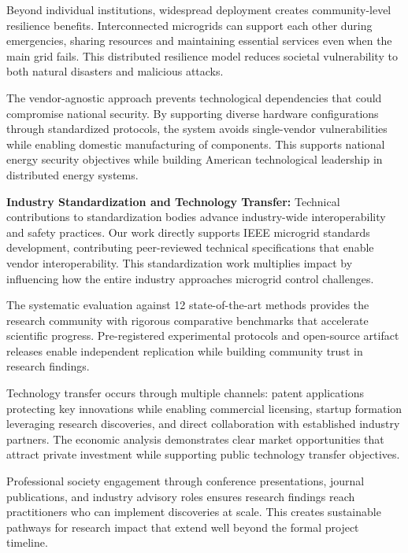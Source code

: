 Beyond individual institutions, widespread deployment creates community-level resilience benefits. Interconnected microgrids can support each other during emergencies, sharing resources and maintaining essential services even when the main grid fails. This distributed resilience model reduces societal vulnerability to both natural disasters and malicious attacks.

The vendor-agnostic approach prevents technological dependencies that could compromise national security. By supporting diverse hardware configurations through standardized protocols, the system avoids single-vendor vulnerabilities while enabling domestic manufacturing of components. This supports national energy security objectives while building American technological leadership in distributed energy systems.

\textbf{Industry Standardization and Technology Transfer:} Technical contributions to standardization bodies advance industry-wide interoperability and safety practices. Our work directly supports IEEE microgrid standards development, contributing peer-reviewed technical specifications that enable vendor interoperability. This standardization work multiplies impact by influencing how the entire industry approaches microgrid control challenges.

The systematic evaluation against 12 state-of-the-art methods \cite{our2024comparative} provides the research community with rigorous comparative benchmarks that accelerate scientific progress. Pre-registered experimental protocols and open-source artifact releases enable independent replication while building community trust in research findings.

Technology transfer occurs through multiple channels: patent applications protecting key innovations while enabling commercial licensing, startup formation leveraging research discoveries, and direct collaboration with established industry partners. The economic analysis demonstrates clear market opportunities that attract private investment while supporting public technology transfer objectives.

Professional society engagement through conference presentations, journal publications, and industry advisory roles ensures research findings reach practitioners who can implement discoveries at scale. This creates sustainable pathways for research impact that extend well beyond the formal project timeline.